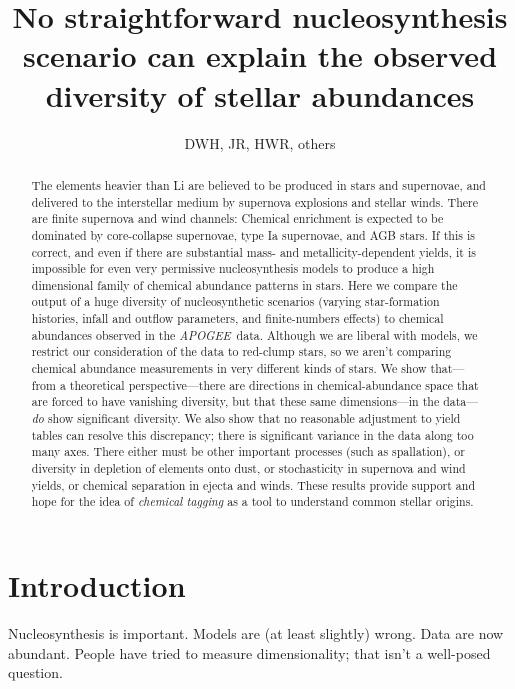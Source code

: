 \documentclass[12pt, preprint]{aastex}
\newcommand{\acronym}[1]{{\small{#1}}}
\newcommand{\project}[1]{\textsl{#1}}
\newcommand{\apogee}{\project{\acronym{APOGEE}}}
\begin{document}
\title{No straightforward nucleosynthesis scenario can explain the
  observed diversity of stellar abundances}
\author{DWH, JR, HWR, others}

\begin{abstract}
The elements heavier than Li are believed to be produced in stars and
supernovae, and delivered to the interstellar medium by supernova
explosions and stellar winds.
There are finite supernova and wind channels: Chemical enrichment is
expected to be dominated by core-collapse supernovae, type Ia
supernovae, and AGB stars.
If this is correct, and even if there are substantial mass- and
metallicity-dependent yields, it is impossible for even very
permissive nucleosynthesis models to produce a high dimensional family
of chemical abundance patterns in stars.
Here we compare the output of a huge diversity of nucleosynthetic
scenarios (varying star-formation histories, infall and outflow
parameters, and finite-numbers effects) to chemical abundances
observed in the \apogee\ data.
Although we are liberal with models, we restrict our consideration of
the data to red-clump stars, so we aren't comparing chemical abundance
measurements in very different kinds of stars.
We show that---from a theoretical perspective---there are directions
in chemical-abundance space that are forced to have vanishing
diversity, but that these same dimensions---in the data---\emph{do}
show significant diversity.
We also show that no reasonable adjustment to yield tables can resolve
this discrepancy; there is significant variance in the data along too
many axes.
There either must be other important processes (such as spallation), or
diversity in depletion of elements onto dust, or stochasticity in
supernova and wind yields, or chemical separation in ejecta and winds.
These results provide support and hope for the idea of \emph{chemical
tagging} as a tool to understand common stellar origins.
\end{abstract}


\section{Introduction}

Nucleosynthesis is important.  Models are (at least slightly) wrong.
Data are now abundant. People have tried to measure dimensionality; that
isn't a well-posed question.

\end{document}
